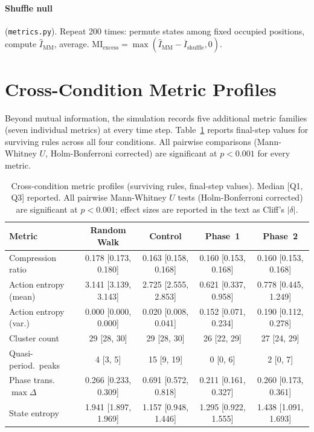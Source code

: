 \documentclass[letterpaper]{article}
\begin{document}
\paragraph{Shuffle null} (\texttt{metrics.py}).
Repeat 200 times: permute states among fixed occupied positions, compute
$\hat{I}_{\mathrm{MM}}$, average.
$\mathrm{MI}_{\mathrm{excess}} = \max(\hat{I}_{\mathrm{MM}} - \overline{I}_{\mathrm{shuffle}}, 0)$.

\section{Cross-Condition Metric Profiles}
\label{app:metric_profiles}

Beyond mutual information, the simulation records five additional metric
families (seven individual metrics) at every time step.
Table~\ref{tab:metric_profiles} reports final-step values for surviving
rules across all four conditions.  All pairwise comparisons
(Mann-Whitney $U$, Holm-Bonferroni corrected) are significant at
$p < 0.001$ for every metric.

\begin{table}[htbp]
\centering
\caption{Cross-condition metric profiles (surviving rules, final-step
values).  Median [Q1, Q3] reported.  All pairwise Mann-Whitney $U$
tests (Holm-Bonferroni corrected) are significant at $p < 0.001$;
effect sizes are reported in the text as Cliff's $|\delta|$.}
\label{tab:metric_profiles}
\begin{tabular}{lcccc}
\toprule
Metric & Random Walk & Control & Phase~1 & Phase~2 \\
\midrule
Compression ratio
  & 0.178 [0.173, 0.180] & 0.163 [0.158, 0.168] & 0.160 [0.153, 0.168] & 0.160 [0.153, 0.168] \\
Action entropy (mean)
  & 3.141 [3.139, 3.143] & 2.725 [2.555, 2.853] & 0.621 [0.337, 0.958] & 0.778 [0.445, 1.249] \\
Action entropy (var.)
  & 0.000 [0.000, 0.000] & 0.020 [0.008, 0.041] & 0.152 [0.071, 0.234] & 0.190 [0.112, 0.278] \\
Cluster count
  & 29 [28, 30] & 29 [28, 30] & 26 [22, 29] & 27 [24, 29] \\
Quasi-period.\ peaks
  & 4 [3, 5] & 15 [9, 19] & 0 [0, 6] & 2 [0, 7] \\
Phase trans.\ $\max \Delta$
  & 0.266 [0.233, 0.309] & 0.691 [0.572, 0.818] & 0.211 [0.161, 0.327] & 0.260 [0.173, 0.361] \\
State entropy
  & 1.941 [1.897, 1.969] & 1.157 [0.948, 1.446] & 1.295 [0.922, 1.555] & 1.438 [1.091, 1.693] \\
\bottomrule
\end{tabular}
\end{table}
\end{document}
